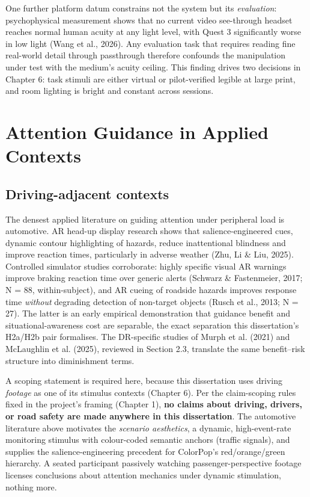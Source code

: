 One further platform datum constrains not the system but its \textit{evaluation}: psychophysical
measurement shows that no current video see-through headset reaches normal human acuity at any
light level, with Quest 3 significantly worse in low light (Wang et al., 2026). Any evaluation task that
requires reading fine real-world detail through passthrough therefore confounds the manipulation
under test with the medium's acuity ceiling. This finding drives two decisions in Chapter 6: task
stimuli are either virtual or pilot-verified legible at large print, and room lighting is bright and
constant across sessions.

\section{Attention Guidance in Applied Contexts}

\subsection{Driving-adjacent contexts}

The densest applied literature on guiding attention under peripheral load is automotive. AR head-up
display research shows that salience-engineered cues, dynamic contour highlighting of hazards,
reduce inattentional blindness and improve reaction times, particularly in adverse weather (Zhu, Li
\& Liu, 2025). Controlled simulator studies corroborate: highly specific visual AR warnings improve
braking reaction time over generic alerts (Schwarz \& Fastenmeier, 2017; N = 88, within-subject), and
AR cueing of roadside hazards improves response time
\textit{without} degrading detection of non-target objects (Rusch et al., 2013; N = 27). The latter is
an early empirical
demonstration that guidance benefit and situational-awareness cost are separable, the exact
separation this dissertation's H2a/H2b pair formalises. The DR-specific studies of Murph et al.
(2021) and McLaughlin et al. (2025), reviewed in Section 2.3, translate the same
benefit–risk structure into diminishment terms.

A scoping statement is required here, because this dissertation uses driving \textit{footage} as one of its
stimulus contexts (Chapter 6). Per the claim-scoping rules fixed in the project's framing (Chapter
1), \textbf{no claims about driving, drivers, or road safety are made anywhere in this dissertation}. The
automotive literature above motivates the \textit{scenario aesthetics}, a dynamic, high-event-rate
monitoring stimulus with colour-coded semantic anchors (traffic signals), and supplies the
salience-engineering precedent for ColorPop's red/orange/green hierarchy. A seated participant
passively watching passenger-perspective footage licenses conclusions about attention mechanics
under dynamic stimulation, nothing more.

